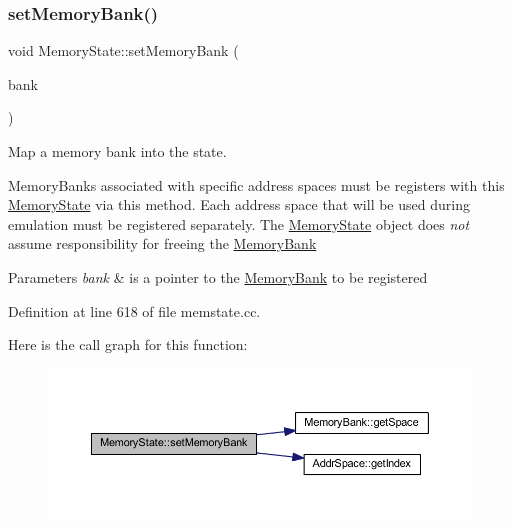 \subsubsection{\texorpdfstring{setMemoryBank()}{setMemoryBank()}}
{\footnotesize\ttfamily void Memory\+State\+::set\+Memory\+Bank (\begin{DoxyParamCaption}\item[{\mbox{\hyperlink{class_memory_bank}{Memory\+Bank}} $\ast$}]{bank }\end{DoxyParamCaption})}



Map a memory bank into the state. 

Memory\+Banks associated with specific address spaces must be registers with this \mbox{\hyperlink{class_memory_state}{Memory\+State}} via this method. Each address space that will be used during emulation must be registered separately. The \mbox{\hyperlink{class_memory_state}{Memory\+State}} object does {\itshape not} assume responsibility for freeing the \mbox{\hyperlink{class_memory_bank}{Memory\+Bank}} 
\begin{DoxyParams}{Parameters}
{\em bank} & is a pointer to the \mbox{\hyperlink{class_memory_bank}{Memory\+Bank}} to be registered \\
\hline
\end{DoxyParams}


Definition at line 618 of file memstate.\+cc.

Here is the call graph for this function\+:
\nopagebreak
\begin{figure}[H]
\begin{center}
\leavevmode
\includegraphics[width=350pt]{class_memory_state_ad1c31dbc7de2dfb6926537c7f9166e92_cgraph}
\end{center}
\end{figure}
\mbox{\label{class_memory_state_af4abdf013cacfaa4cfbe223f3893a76a}} 
